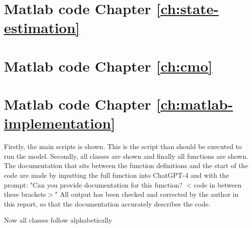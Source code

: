 \begin{appendices}
\newpage
\section{Matlab code Chapter \ref{ch:state-estimation}}\label{ap:matlab-code-ch3}


\newpage
\section{Matlab code Chapter \ref{ch:cmo}}\label{ap:matlab-code-ch6}


\newpage
\section{Matlab code Chapter \ref{ch:matlab-implementation}}\label{ap:matlab-code}
Firstly, the main scripts is shown. This is the script than should be executed to run the model. Secondly, all classes are shown and finally all functions are shown. The documentation that sits between the function definitions and the start of the code are made by inputting the full function into ChatGPT-4 and with the prompt: "Can you provide documentation for this function? $<$code in between these brackets$>$" All output has been checked and corrected by the author in this report, so that the documentation accurately describes the code.

Now all classes follow alphabetically








\end{appendices}

